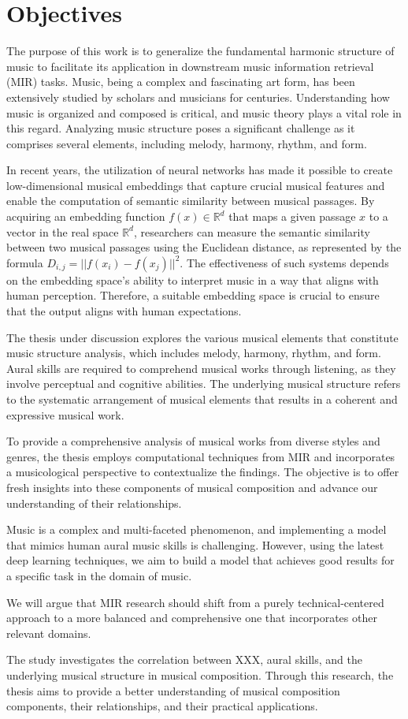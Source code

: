 \section{Objectives}

The purpose of this work is to generalize the fundamental harmonic structure of music to facilitate its application in downstream music information retrieval (MIR) tasks. Music, being a complex and fascinating art form, has been extensively studied by scholars and musicians for centuries. Understanding how music is organized and composed is critical, and music theory plays a vital role in this regard. Analyzing music structure poses a significant challenge as it comprises several elements, including melody, harmony, rhythm, and form.

In recent years, the utilization of neural networks has made it possible to create low-dimensional musical embeddings that capture crucial musical features and enable the computation of semantic similarity between musical passages. By acquiring an embedding function $f(x) \in \mathbb{R}^d$ that maps a given passage $x$ to a vector in the real space $\mathbb{R}^d$, researchers can measure the semantic similarity between two musical passages using the Euclidean distance, as represented by the formula $D_{i,j} = ||f(x_i) - f(x_j)||^2$. The effectiveness of such systems depends on the embedding space's ability to interpret music in a way that aligns with human perception. Therefore, a suitable embedding space is crucial to ensure that the output aligns with human expectations.

The thesis under discussion explores the various musical elements that constitute music structure analysis, which includes melody, harmony, rhythm, and form. Aural skills are required to comprehend musical works through listening, as they involve perceptual and cognitive abilities. The underlying musical structure refers to the systematic arrangement of musical elements that results in a coherent and expressive musical work.

To provide a comprehensive analysis of musical works from diverse styles and genres, the thesis employs computational techniques from MIR and incorporates a musicological perspective to contextualize the findings. The objective is to offer fresh insights into these components of musical composition and advance our understanding of their relationships.


Music is a complex and multi-faceted phenomenon, and implementing a model that mimics human aural music skills is challenging. However, using the latest deep learning techniques, we aim to build a model that achieves good results for a specific task in the domain of music.

We will argue that MIR research should shift from a purely technical-centered approach to a more balanced and comprehensive one that incorporates other relevant domains.

The study investigates the correlation between XXX, aural skills, and the underlying musical structure in musical composition. Through this research, the thesis aims to provide a better understanding of musical composition components, their relationships, and their practical applications.